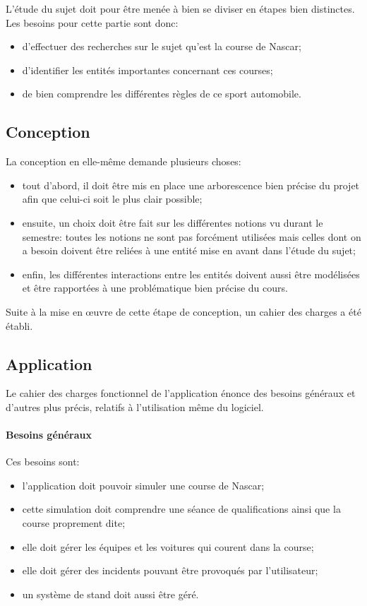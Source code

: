 \documentclass[a4paper, 11pt]{article}
\begin{document}
		L'étude du sujet doit pour être menée à bien se diviser en étapes bien distinctes. Les besoins pour cette partie sont donc:
		\begin{itemize}
			\item d'effectuer des recherches sur le sujet qu'est la course de Nascar;
			\item d'identifier les entités importantes concernant ces courses;
			\item de bien comprendre les différentes règles de ce sport automobile.
		\end{itemize}
		
		\subsection{Conception}
		
		La conception en elle-même demande plusieurs choses:
		\begin{itemize}
			\item tout d'abord, il doit être mis en place une arborescence bien précise du projet afin que celui-ci soit le plus clair possible;
			\item ensuite, un choix doit être fait sur les différentes notions vu durant le semestre: toutes les notions ne sont pas forcément utilisées mais celles dont on a besoin doivent être reliées à une entité mise en avant dans l'étude du sujet;
			\item enfin, les différentes interactions entre les entités doivent aussi être modélisées et être rapportées à une problématique bien précise du cours. \\
		\end{itemize}
		
		Suite à la mise en œuvre de cette étape de conception, un cahier des charges a été établi.
		
		\subsection{Application}
		
		Le cahier des charges fonctionnel de l'application énonce des besoins généraux et d'autres plus précis, relatifs à l'utilisation même du logiciel.
		
			\paragraph{Besoins généraux}
			
			Ces besoins sont:
			\begin{itemize}
				\item l'application doit pouvoir simuler une course de Nascar; 
				\item cette simulation doit comprendre une séance de qualifications ainsi que la course proprement dite;
				\item elle doit gérer les équipes et les voitures qui courent dans la course;
				\item elle doit gérer des incidents pouvant être provoqués par l'utilisateur;
				\item un système de stand doit aussi être géré.
			\end{itemize}
			
\end{document}

